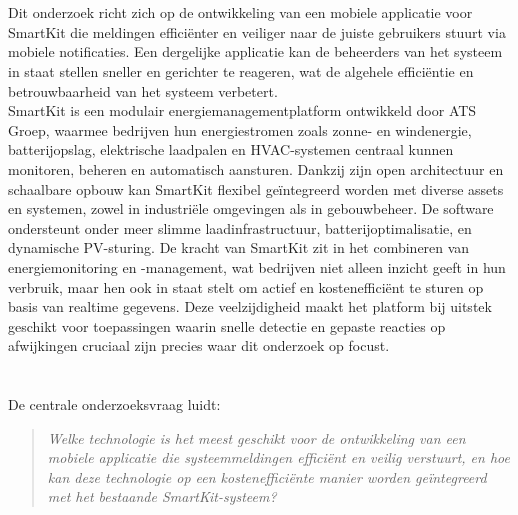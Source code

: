 \section{}%
\label{sec:probleemstelling}

\noindent
Dit onderzoek richt zich op de ontwikkeling van een mobiele applicatie voor SmartKit die meldingen efficiënter en veiliger naar de juiste gebruikers stuurt via mobiele notificaties. Een dergelijke applicatie kan de beheerders van het systeem in staat stellen sneller en gerichter te reageren, wat de algehele efficiëntie en betrouwbaarheid van het systeem verbetert.\\

SmartKit is een modulair energiemanagementplatform ontwikkeld door ATS Groep, waarmee bedrijven hun energiestromen zoals zonne- en windenergie, batterijopslag, elektrische laadpalen en HVAC-systemen centraal kunnen monitoren, beheren en automatisch aansturen. Dankzij zijn open architectuur en schaalbare opbouw kan SmartKit flexibel geïntegreerd worden met diverse assets en systemen, zowel in industriële omgevingen als in gebouwbeheer. De software ondersteunt onder meer slimme laadinfrastructuur, batterijoptimalisatie, en dynamische PV-sturing. De kracht van SmartKit zit in het combineren van energiemonitoring en -management, wat bedrijven niet alleen inzicht geeft in hun verbruik, maar hen ook in staat stelt om actief en kostenefficiënt te sturen op basis van realtime gegevens. Deze veelzijdigheid maakt het platform bij uitstek geschikt voor toepassingen waarin snelle detectie en gepaste reacties op afwijkingen cruciaal zijn precies waar dit onderzoek op focust.\\


\section{}%
\label{sec:onderzoeksvraag}

\noindent De centrale onderzoeksvraag luidt:

\begin{quote} 
	\textit{Welke technologie is het meest geschikt voor de ontwikkeling van een mobiele applicatie die systeemmeldingen efficiënt en veilig verstuurt, en hoe kan deze technologie op een kostenefficiënte manier worden geïntegreerd met het bestaande SmartKit-systeem?} 
\end{quote}

